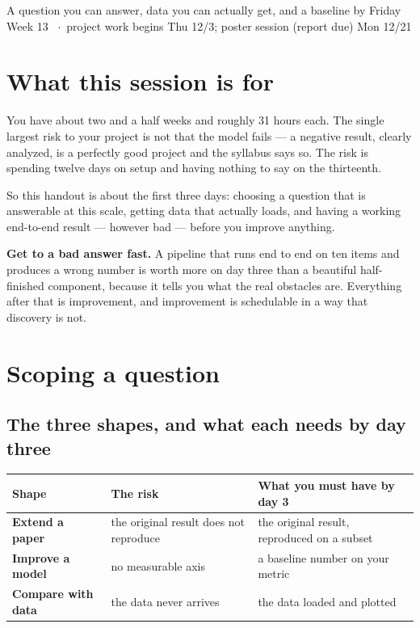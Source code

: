 \documentclass[11pt]{article}
\begin{document}
  {A question you can answer, data you can actually get, and a baseline by Friday}
  {Week 13 \ $\cdot$\ project work begins Thu 12/3; poster session (report due) Mon 12/21}

\section*{What this session is for}

You have about two and a half weeks and roughly 31 hours each. The single
largest risk to your project is not that the model fails --- a negative result,
clearly analyzed, is a perfectly good project and the syllabus says so. The risk
is spending twelve days on setup and having nothing to say on the thirteenth.

So this handout is about the first three days: choosing a question that is
answerable at this scale, getting data that actually loads, and having a working
end-to-end result --- however bad --- before you improve anything.

\begin{keybox}
 \textbf{Get to a bad answer fast.} A pipeline that runs
end to end on ten items and produces a wrong number is worth more on day three
than a beautiful half-finished component, because it tells you what the real
obstacles are. Everything after that is improvement, and improvement is
schedulable in a way that discovery is not.
\end{keybox}

\section{Scoping a question}

\subsection{The three shapes, and what each needs by day three}

\begin{center}
\begin{tabular}{@{}p{}p{}p{}@{}}
\toprule
Shape & The risk & What you must have by day 3 \\
\midrule
\textbf{Extend a paper} & the original result does not reproduce & the original result, reproduced on a subset \\
\textbf{Improve a model} & no measurable axis & a baseline number on your metric \\
\textbf{Compare with data} & the data never arrives & the data loaded and plotted \\
\bottomrule
\end{tabular}
\end{center}
\end{document}

